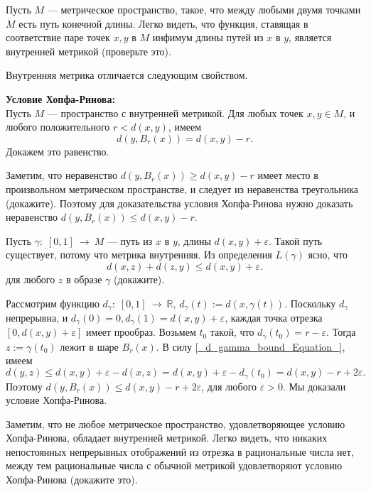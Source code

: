 \documentclass[12pt]{book}
\newcommand{\arrow}{{\:\longrightarrow\:}}
\def\endproof{\hbox{\vrule width 5pt height 5pt depth 0pt}}
\renewcommand{\epsilon}{\varepsilon}
\def\R{{\mathbb R}}
\theoremstyle{upshape}
\theoremstyle{generic}
\theoremstyle{upshapenonumber}
\newcommand{\следствие}{%
     \refstepcounter{teorema}
     {\noindent\bf Следствие \thechapter.\arabic{teorema}:\ }}
\newcommand{\пример}{%
     \refstepcounter{teorema}
     {\noindent\bf Пример \thechapter.\arabic{teorema}:\ }}
\newcommand{\лемма}{%
     \refstepcounter{teorema}
     {\noindent\bf Лемма \thechapter.\arabic{teorema}:\ }}
\newcommand{\теорема}{%
     \refstepcounter{teorema}
     {\noindent\bf Теорема \thechapter.\arabic{teorema}:\ }}
\newcommand{\утверждение}{%
     \refstepcounter{teorema}
     {\noindent\bf Утверждение \thechapter.\arabic{teorema}:\ }}
\def\хфилл{\hfill}
\def\бф{\bf}
\begin{document}
Пусть $M$ --- метрическое пространство,
такое, что между любыми двумя точками $M$
есть путь конечной длины. Легко видеть, что функция,
ставящая в соответствие паре точек $x,y$
в $M$ инфимум длины путей из $x$ в $y$,
является внутренней метрикой (проверьте это).

\hfill

Внутренняя метрика отличается следующим свойством.

\хфилл


{\бф Условие Хопфа-Ринова:}\\
Пусть $M$ --- пространство с внутренней метрикой.
Для любых точек $x, y \in M$, и любого положительного
$r < d(x,y)$, имеем
\[
d(y, B_r(x)) = d(x,y) -r.
\]
Докажем это равенство.

\хфилл

Заметим, что неравенство $d(y, B_r(x)) \geq d(x,y) -r$
имеет место в произвольном метрическом пространстве,
и следует из неравенства треугольника (докажите). Поэтому для
доказательства условия Хопфа-Ринова нужно доказать 
неравенство $d(y, B_r(x)) \leq d(x,y) -r$.

Пусть $\gamma:\; [0, 1]\arrow M$ --- путь
из $x$ в $y$, длины $d(x,y)+\epsilon$. Такой путь
существует, потому что метрика внутренняя. Из определения
$L(\gamma)$ ясно, что 
\begin{equation}\label{_d_gamma_bound_Equation_}
d(x, z) + d(z,y) \leq d(x,y)+\epsilon.
\end{equation}
для любого $z$ в образе $\gamma$ (докажите).

Рассмотрим функцию $d_\gamma:\; [0,1] \arrow \R$,
$d_\gamma(t):=d(x, \gamma(t))$. 
Поскольку $d_\gamma$
непрерывна, и $d_\gamma(0)=0, d_\gamma(1) = d(x,y)+\epsilon$,
каждая точка отрезка $[0, d(x,y)+\epsilon]$
имеет прообраз. Возьмем $t_0$ такой, что
$d_\gamma(t_0)= r-\epsilon$. Тогда $z:=\gamma(t_0)$
лежит в шаре $B_r(x)$. В силу \eqref{_d_gamma_bound_Equation_}, 
имеем
\[ 
  d(y, z) \leq d(x,y) +\epsilon-d(x, z) = 
  d(x,y)+\epsilon- d_\gamma(t_0) = d(x,y)-r+2\epsilon.
\]
Поэтому $d(y, B_r(x)) \leq d(x,y)-r+2\epsilon$,
для любого $\epsilon >0$. 
Мы доказали условие Хопфа-Ринова. \endproof

\хфилл

Заметим, что не любое метрическое пространство,
удовлетворяющее условию Хопфа-Ринова, обладает
внутренней метрикой. Легко видеть, что никаких
непостоянных непрерывных отображений из отрезка
в рациональные числа нет, между тем рациональные
числа с обычной метрикой удовлетворяют 
условию Хопфа-Ринова (докажите это).
\end{document}
